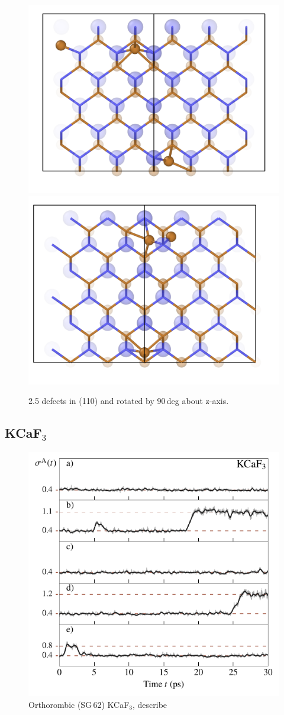 \documentclass[nobib,a4paper,twoside,notoc,justified,marginals=justified]{tufte-book}
\begin{document}
\begin{figure}
	\includegraphics[width=.5\textwidth]{./plots/defects/216.02.CuI/defects_110.png} \hfill
	\includegraphics[width=.5\textwidth]{./plots/defects/216.02.CuI/defects_110_135.png}
	\caption{2.5 defects in (110) and rotated by 90\,deg about z-axis.}
	\label{}
\end{figure}

\subsection{KCaF$_3$}

\begin{figure}
	\includegraphics[width=\textwidth]{./plots/defects/062.05.KCaF3/sigma_vs_time.pdf}
	\caption{Orthorombic (SG\,62) KCaF$_3$, describe}
	\label{}
\end{figure}
\end{document}
